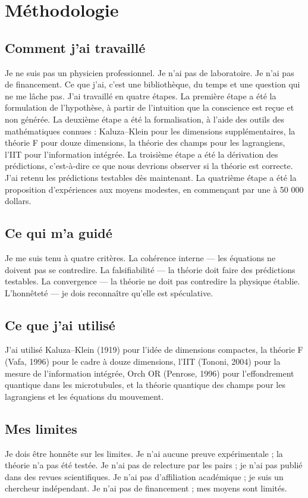 \section{Méthodologie}
\subsection{Comment j'ai travaillé}
Je ne suis pas un physicien professionnel. Je n'ai pas de laboratoire. Je n'ai pas de financement. Ce que j'ai, c'est une bibliothèque, du temps et une question qui ne me lâche pas. J'ai travaillé en quatre étapes. La première étape a été la formulation de l'hypothèse, à partir de l'intuition que la conscience est reçue et non générée. La deuxième étape a été la formalisation, à l'aide des outils des mathématiques connues : Kaluza--Klein pour les dimensions supplémentaires, la théorie F pour douze dimensions, la théorie des champs pour les lagrangiens, l'IIT pour l'information intégrée. La troisième étape a été la dérivation des prédictions, c'est-à-dire ce que nous devrions observer si la théorie est correcte. J'ai retenu les prédictions testables dès maintenant. La quatrième étape a été la proposition d'expériences aux moyens modestes, en commençant par une à 50 000 dollars.

\subsection{Ce qui m'a guidé}
Je me suis tenu à quatre critères. La cohérence interne --- les équations ne doivent pas se contredire. La falsifiabilité --- la théorie doit faire des prédictions testables. La convergence --- la théorie ne doit pas contredire la physique établie. L'honnêteté --- je dois reconnaître qu'elle est spéculative.

\subsection{Ce que j'ai utilisé}
J'ai utilisé Kaluza--Klein (1919) pour l'idée de dimensions compactes, la théorie F (Vafa, 1996) pour le cadre à douze dimensions, l'IIT (Tononi, 2004) pour la mesure de l'information intégrée, Orch OR (Penrose, 1996) pour l'effondrement quantique dans les microtubules, et la théorie quantique des champs pour les lagrangiens et les équations du mouvement.

\subsection{Mes limites}
Je dois être honnête sur les limites. Je n'ai aucune preuve expérimentale ; la théorie n'a pas été testée. Je n'ai pas de relecture par les pairs ; je n'ai pas publié dans des revues scientifiques. Je n'ai pas d'affiliation académique ; je suis un chercheur indépendant. Je n'ai pas de financement ; mes moyens sont limités.
